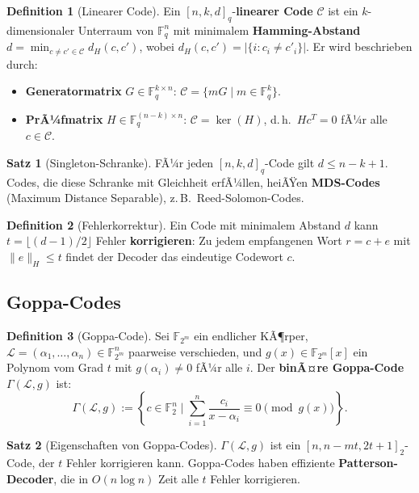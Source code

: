 ﻿\documentclass[a4paper,12pt]{scrreprt}
\theoremstyle{definition}
\newtheorem{definition}{Definition}[section]
\newtheorem{satz}{Satz}[section]
\begin{document}
\begin{definition}[Linearer Code]
Ein $[n, k, d]_q$-\textbf{linearer Code} $\mathcal{C}$ ist ein $k$-dimensionaler Unterraum von $\mathbb{F}_q^n$ mit minimalem \textbf{Hamming-Abstand} $d = \min_{c \neq c' \in \mathcal{C}} d_H(c, c')$, wobei $d_H(c, c') = |\{i : c_i \neq c'_i\}|$. Er wird beschrieben durch:
\begin{itemize}
    \item \textbf{Generatormatrix} $G \in \mathbb{F}_q^{k \times n}$: $\mathcal{C} = \{mG \mid m \in \mathbb{F}_q^k\}$.
    \item \textbf{PrÃ¼fmatrix} $H \in \mathbb{F}_q^{(n-k) \times n}$: $\mathcal{C} = \ker(H)$, d.\,h.\ $Hc^T = 0$ fÃ¼r alle $c \in \mathcal{C}$.
\end{itemize}
\end{definition}

\begin{satz}[Singleton-Schranke]
FÃ¼r jeden $[n,k,d]_q$-Code gilt $d \leq n - k + 1$. Codes, die diese Schranke mit Gleichheit erfÃ¼llen, heiÃŸen \textbf{MDS-Codes} (Maximum Distance Separable), z.\,B.\ Reed-Solomon-Codes.
\end{satz}

\begin{definition}[Fehlerkorrektur]
Ein Code mit minimalem Abstand $d$ kann $t = \lfloor(d-1)/2\rfloor$ Fehler \textbf{korrigieren}: Zu jedem empfangenen Wort $r = c + e$ mit $\|e\|_H \leq t$ findet der Decoder das eindeutige Codewort $c$.
\end{definition}

\subsection{Goppa-Codes}

\begin{definition}[Goppa-Code]
Sei $\mathbb{F}_{2^m}$ ein endlicher KÃ¶rper, $\mathcal{L} = (\alpha_1,\ldots,\alpha_n) \in \mathbb{F}_{2^m}^n$ paarweise verschieden, und $g(x) \in \mathbb{F}_{2^m}[x]$ ein Polynom vom Grad $t$ mit $g(\alpha_i) \neq 0$ fÃ¼r alle $i$. Der \textbf{binÃ¤re Goppa-Code} $\Gamma(\mathcal{L}, g)$ ist:
\[
\Gamma(\mathcal{L}, g) := \left\{ c \in \mathbb{F}_2^n \;\Big|\; \sum_{i=1}^n \frac{c_i}{x - \alpha_i} \equiv 0 \pmod{g(x)} \right\}.
\]
\end{definition}

\begin{satz}[Eigenschaften von Goppa-Codes]
$\Gamma(\mathcal{L}, g)$ ist ein $[n, n-mt, 2t+1]_2$-Code, der $t$ Fehler korrigieren kann. Goppa-Codes haben effiziente \textbf{Patterson-Decoder}, die in $O(n \log n)$ Zeit alle $t$ Fehler korrigieren.
\end{satz}
\end{document}
